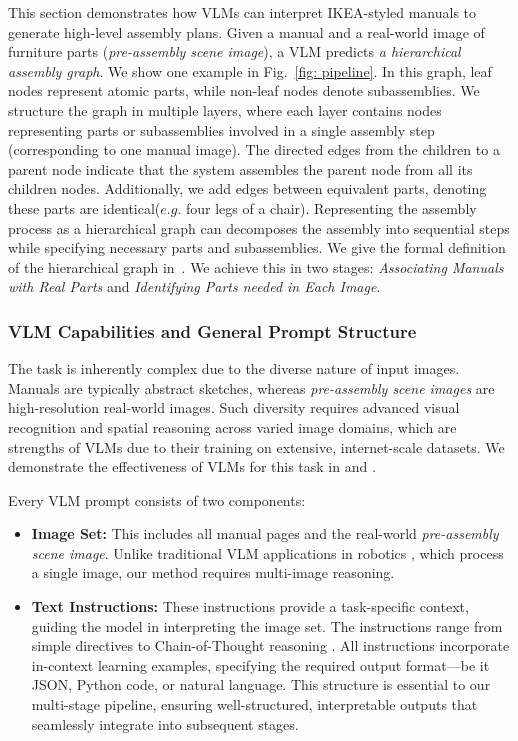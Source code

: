 This section demonstrates how VLMs can interpret IKEA-styled manuals to generate high-level assembly plans. Given a manual and a real-world image of furniture parts (\emph{pre-assembly scene image}), a VLM predicts \emph{a hierarchical assembly graph}. We show one example in Fig.~\ref{fig: pipeline}. In this graph, leaf nodes represent atomic parts, while non-leaf nodes denote subassemblies. We structure the graph in multiple layers, where each layer contains nodes representing parts or subassemblies involved in a single assembly step (corresponding to one manual image). The directed edges from the children to a parent node indicate that the system assembles the parent node from all its children nodes. 
Additionally, we add edges between equivalent parts, denoting these parts are identical($e.g.$ four legs of a chair).
Representing the assembly process as a hierarchical graph can decomposes the assembly into sequential steps while specifying necessary parts and subassemblies. 
We give the formal definition of the hierarchical graph in~.
We achieve this in two stages: \textit{Associating Manuals with Real Parts} and \textit{Identifying Parts needed in Each Image}.

\subsubsection{VLM Capabilities and General Prompt Structure} The task is inherently complex due to the diverse nature of input images. Manuals are typically abstract sketches, whereas \emph{pre-assembly scene images} are high-resolution real-world images. 
Such diversity requires advanced visual recognition and spatial reasoning across varied image domains, which are strengths of VLMs due to their training on extensive, internet-scale datasets. We demonstrate the effectiveness of VLMs for this task in  and 
.

Every VLM prompt consists of two components: 
\begin{itemize}
  \item  \textbf{Image Set:} This includes all manual pages and the real-world \emph{pre-assembly scene image}. Unlike traditional VLM applications in robotics \cite{kim2024openvla, huang2024rekep}, which process a single image, our method requires multi-image reasoning.
  \item \textbf{Text Instructions:} These instructions provide a task-specific context, guiding the model in interpreting the image set. The instructions range from simple directives to Chain-of-Thought reasoning \cite{wei2022chain}. All instructions incorporate in-context learning examples, specifying the required output format—be it JSON, Python code, or natural language. This structure is essential to our multi-stage pipeline, ensuring well-structured, interpretable outputs that seamlessly integrate into subsequent stages.
\end{itemize}

